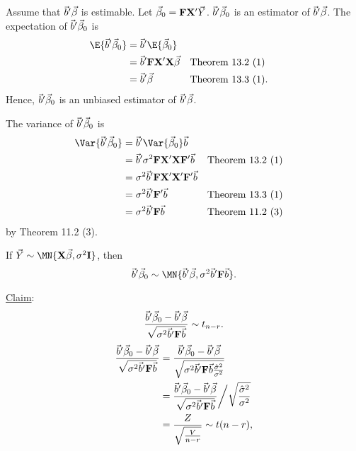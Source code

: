 \begin{Remark}{}{}
    Assume that $ \vec{b}'\vec{\beta} $ is estimable. Let
    $ \vec{\beta}_0=\mathbf{F}\mathbf{X}'\vec{Y} $.
    $ \vec{b}'\vec{\beta}_0 $ is an estimator of $ \vec{b}'\vec{\beta} $.
    \tcblower{}
    The expectation of $ \vec{b}'\vec{\beta}_0 $ is
    \begin{align*}
        \E{\Vector{b}'\Vector{\beta}_0}
         & =\Vector{b}'\E{\Vector{\beta}_0}                                                        \\
         & =\Vector{b}'\Matrix{F}\Matrix{X}'\Matrix{X}\Vector{\beta} &  & \text{Theorem 13.2 (1)}  \\
         & =\Vector{b}'\Vector{\beta}                                &  & \text{Theorem 13.3 (1)}.
    \end{align*}
    Hence, $ \vec{b}'\vec{\beta}_0 $ is an unbiased estimator of $ \vec{b}'\vec{\beta} $.

    The variance of $ \vec{b}'\vec{\beta}_0 $ is
    \begin{align*}
        \Var{\Vector{b}'\Vector{\beta}_0}
         & =\Vector{b}'\Var{\Vector{\beta}_0}\Vector{b}                                                            \\
         & =\Vector{b}'\sigma^2 \Matrix{F}\Matrix{X}'\Matrix{X}\Matrix{F}'\Vector{b}  &  & \text{Theorem 13.2 (1)} \\
         & =\sigma^2 \Vector{b}'\Matrix{F}\Matrix{X}'\Matrix{X}'\Matrix{F}'\Vector{b}                              \\
         & =\sigma^2 \Vector{b}'\Matrix{F}'\Vector{b}                                 &  & \text{Theorem 13.3 (1)} \\
         & =\sigma^2 \Vector{b}'\Matrix{F}\Vector{b}                                  &  & \text{Theorem 11.2 (3)}
    \end{align*}
    by Theorem 11.2 (3).
\end{Remark}
\begin{Theorem}{}{}
    If $ \Vector{Y} \sim \MN{\Matrix{X}\Vector{\beta},\sigma^2\Matrix{I}} $,
    then
    \[ \Vector{b}'\Vector{\beta}_0 \sim \MN{\Vector{b}'\Vector{\beta},
            \sigma^2\Vector{b}'\Matrix{F}\Vector{b}}. \]
\end{Theorem}
\underline{Claim}:
\[ \frac{\vec{b}'\vec{\beta}_0-\vec{b}'\vec{\beta}}{\sqrt{\sigma^2\vec{b}'\mathbf{F}\vec{b}}}\sim t_{n-r}. \]
\begin{align*}
    \frac{\vec{b}'\vec{\beta}_0-\vec{b}'\vec{\beta}}{\sqrt{\sigma^2\vec{b}'\mathbf{F}\vec{b}}}
     & =\frac{\vec{b}'\vec{\beta}_0-\vec{b}'\vec{\beta}}{
        \sqrt{\sigma^2 \vec{b}'\mathbf{F}\vec{b}\frac{\hat{\sigma}^2}{\sigma^2}}
    }                                                                 \\
     & =\frac{\vec{b}'\vec{\beta}_0-\vec{b}'\vec{\beta}}{
        \sqrt{\sigma^2 \vec{b}'\mathbf{F}\vec{b}}
    }\bigg/\sqrt{\frac{\hat{\sigma}^2}{\sigma^2}}                     \\
     & =\frac{Z}{\sqrt{\frac{V}{n-r}}} \sim t(n-r),
\end{align*}
